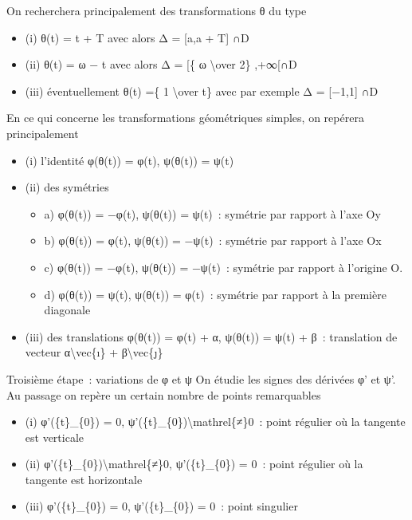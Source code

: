 \documentclass[]{article}
\begin{document}
On recherchera principalement des transformations θ du type

\begin{itemize}
\itemsep1pt\parskip0pt
\item
  (i) θ(t) = t + T avec alors Δ = {[}a,a + T{]} ∩D
\item
  (ii) θ(t) = ω − t avec alors Δ = {[}\{ ω \textbackslash{}over 2\}
  ,+∞{[}∩D
\item
  (iii) éventuellement θ(t) =\{ 1 \textbackslash{}over t\} avec par
  exemple Δ = {[}−1,1{]} ∩D
\end{itemize}

En ce qui concerne les transformations géométriques simples, on repérera
principalement

\begin{itemize}
\itemsep1pt\parskip0pt
\item
  (i) l'identité φ(θ(t)) = φ(t), ψ(θ(t)) = ψ(t)
\item
  (ii) des symétries

  \begin{itemize}
  \itemsep1pt\parskip0pt
  \item
    a) φ(θ(t)) = −φ(t), ψ(θ(t)) = ψ(t)~: symétrie par rapport à l'axe Oy
  \item
    b) φ(θ(t)) = φ(t), ψ(θ(t)) = −ψ(t)~: symétrie par rapport à l'axe Ox
  \item
    c) φ(θ(t)) = −φ(t), ψ(θ(t)) = −ψ(t)~: symétrie par rapport à
    l'origine O.
  \item
    d) φ(θ(t)) = ψ(t), ψ(θ(t)) = φ(t)~: symétrie par rapport à la
    première diagonale
  \end{itemize}
\item
  (iii) des translations φ(θ(t)) = φ(t) + α, ψ(θ(t)) = ψ(t) + β~:
  translation de vecteur α\textbackslash{}vec\{ı\} +
  β\textbackslash{}vec\{ȷ\}
\end{itemize}

Troisième étape~: variations de φ et ψ On étudie les signes des dérivées
φ' et ψ'. Au passage on repère un certain nombre de points remarquables

\begin{itemize}
\itemsep1pt\parskip0pt
\item
  (i) φ'(\{t\}\_\{0\}) = 0,
  ψ'(\{t\}\_\{0\})\textbackslash{}mathrel\{≠\}0~: point régulier où la
  tangente est verticale
\item
  (ii) φ'(\{t\}\_\{0\})\textbackslash{}mathrel\{≠\}0, ψ'(\{t\}\_\{0\}) =
  0~: point régulier où la tangente est horizontale
\item
  (iii) φ'(\{t\}\_\{0\}) = 0, ψ'(\{t\}\_\{0\}) = 0~: point singulier
\end{itemize}
\end{document}

